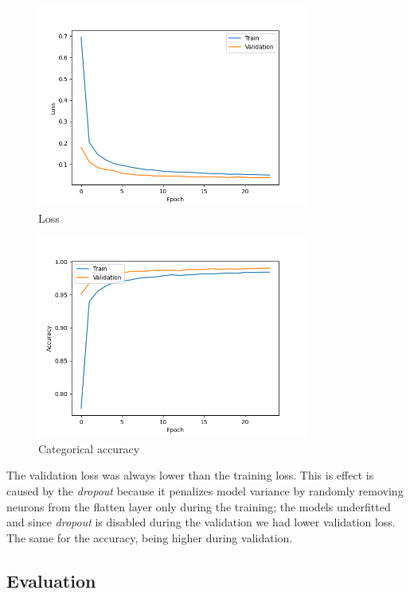 \documentclass[compsoc]{IEEEtran}
\begin{document}
\begin{figure}[ht!]
\centering                                                                        
\includegraphics[width=3.5in]{loss.png}
\captionsetup{justification=centering}                                                                                         
\caption{Loss}
\label{fig:loss}                                                                                                                               
\end{figure}


\begin{figure}[ht!]
\centering                                                                        
\includegraphics[width=3.5in]{acc.png}
\captionsetup{justification=centering}                                                                                         
\caption{Categorical accuracy}
\label{fig:acc}                                                                                                                               
\end{figure}

The validation loss was always lower than the training loss. This is effect is caused by the \emph{dropout} because it penalizes model variance by randomly removing neurons from the flatten layer only during the training; the models underfitted and since \emph{dropout} is disabled during the validation we had lower validation loss. The same for the accuracy, being higher during validation.


\subsection{Evaluation}
\end{document}
